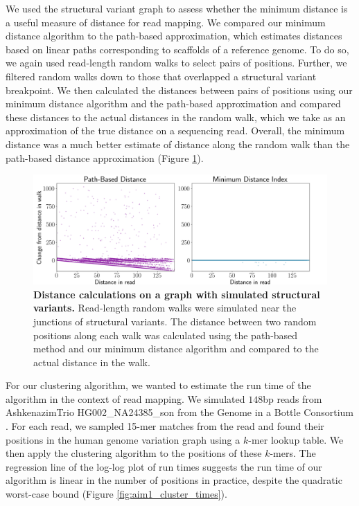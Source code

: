 \documentclass[11pt]{ucscthesis}
\begin{document}
We used the structural variant graph to assess whether the minimum distance is a useful measure of distance for read mapping.
We compared our minimum distance algorithm to the path-based approximation, which estimates distances based on linear paths corresponding to scaffolds of a reference genome.
To do so, we again used read-length random walks to select pairs of positions.
Further, we filtered random walks down to those that overlapped a structural variant breakpoint.
We then calculated the distances between pairs of positions using our minimum distance algorithm and the path-based approximation and compared these distances to the actual distances in the random walk, which we take as an approximation of the true distance on a sequencing read.
Overall, the minimum distance was a much better estimate of distance along the random walk than the path-based distance approximation (Figure \ref{fig:aim1_sv_distances}).


\begin{figure}[H]
    \centering
    \includegraphics[width=\columnwidth]{aim1_sv_distances.png}
    \caption[Distance calculations on a graph with simulated structural variants]{\textbf{Distance calculations on a graph with simulated structural variants.} Read-length random walks were simulated near the junctions of structural variants. The distance between two random positions along each walk was calculated using the path-based method and our minimum distance algorithm and compared to the actual distance in the walk.}
    \label{fig:aim1_sv_distances}
\end{figure}

For our clustering algorithm, we wanted to estimate the run time of the algorithm in the context of read mapping. We simulated $148$bp reads from AshkenazimTrio HG002\_NA24385\_son from the Genome in a Bottle Consortium \cite{zook_extensive_2016}.
For each read, we sampled 15-mer matches from the read and found their positions in the human genome variation graph using a $k$-mer lookup table. We then apply the clustering algorithm to the positions of these $k$-mers.
The regression line of the log-log plot of run times suggests the run time of our algorithm is linear in the number of positions in practice, despite the quadratic worst-case bound (Figure \ref{fig:aim1_cluster_times}).
\end{document}
